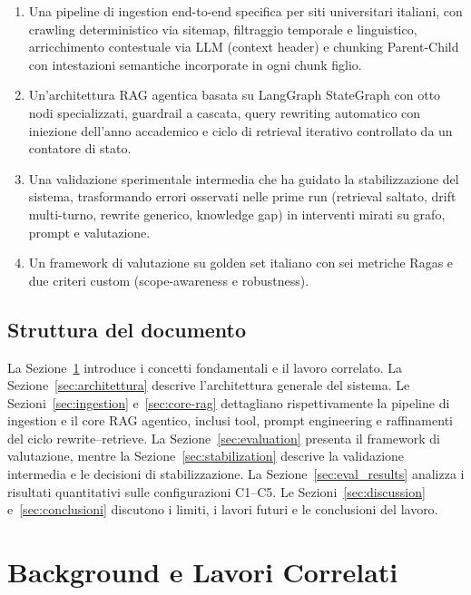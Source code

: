 \documentclass[11pt,a4paper]{article}
\begin{document}
\begin{enumerate}
  \item Una pipeline di ingestion end-to-end specifica per siti universitari italiani, con
        crawling deterministico via sitemap, filtraggio temporale e linguistico, arricchimento
        contestuale via LLM (context header) e chunking Parent-Child con intestazioni
        semantiche incorporate in ogni chunk figlio.

  \item Un'architettura RAG agentica basata su LangGraph StateGraph con otto nodi
        specializzati, guardrail a cascata, query rewriting automatico con iniezione
        dell'anno accademico e ciclo di retrieval iterativo controllato da un contatore di
        stato.

  \item Una validazione sperimentale intermedia che ha guidato la stabilizzazione del
        sistema, trasformando errori osservati nelle prime run (retrieval saltato,
        drift multi-turno, rewrite generico, knowledge gap) in interventi mirati su grafo,
        prompt e valutazione.

  \item Un framework di valutazione su golden set italiano con sei metriche Ragas e due
        criteri custom (scope-awareness e robustness).
\end{enumerate}

\subsection{Struttura del documento}

La Sezione~\ref{sec:background} introduce i concetti fondamentali e il lavoro correlato.
La Sezione~\ref{sec:architettura} descrive l'architettura generale del sistema. Le
Sezioni~\ref{sec:ingestion} e~\ref{sec:core-rag} dettagliano rispettivamente la pipeline
di ingestion e il core RAG agentico, inclusi tool, prompt engineering e raffinamenti
del ciclo rewrite--retrieve. La Sezione~\ref{sec:evaluation} presenta il framework di
valutazione, mentre la Sezione~\ref{sec:stabilization} descrive la validazione intermedia
e le decisioni di stabilizzazione. La Sezione~\ref{sec:eval_results} analizza i risultati
quantitativi sulle configurazioni C1--C5. Le Sezioni~\ref{sec:discussion}
e~\ref{sec:conclusioni} discutono i limiti, i lavori futuri e le conclusioni del lavoro.

\section{Background e Lavori Correlati}
\label{sec:background}
\end{document}
